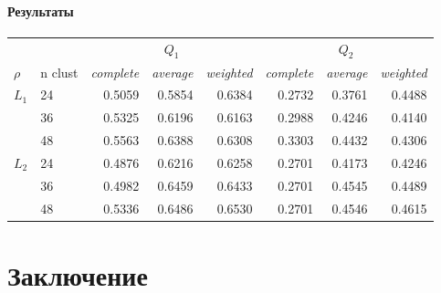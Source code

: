 \documentclass[12pt,twoside]{article}
\begin{document}
        \paragraph{Результаты}
            \begin{center}
                \begin{tabular}{ll|rrr|rrr}  
                    \toprule
                    & & \multicolumn{3}{c|}{$Q_1$} & \multicolumn{3}{c}{$Q_2$} \\
                    \cmidrule(r){3-8}
                $\rho$ & n clust & \textit{complete} & \textit{average} & \textit{weighted} & \textit{complete} & \textit{average} & \textit{weighted} \\
                    \midrule
                $L_1$   & 24    &   0.5059  &   0.5854 &    0.6384  & 0.2732   &  0.3761    &   0.4488  \\
                        & 36    &   0.5325  &   0.6196 &    0.6163  & 0.2988   &  0.4246    &   0.4140  \\
                        & 48    &   0.5563  &   0.6388 &    0.6308  & 0.3303   &  0.4432    &   0.4306  \\
                $L_2$   & 24    &   0.4876  &   0.6216 &    0.6258  & 0.2701   &  0.4173    &   0.4246  \\
                        & 36    &   0.4982  &   0.6459 &    0.6433  & 0.2701   &  0.4545    &   0.4489  \\
                        & 48    &   0.5336  &   0.6486 &    0.6530  & 0.2701   &  0.4546    &   0.4615  \\
                \bottomrule
                \end{tabular}
            \end{center}

    \section{Заключение}

	 
    
    
\end{document}
